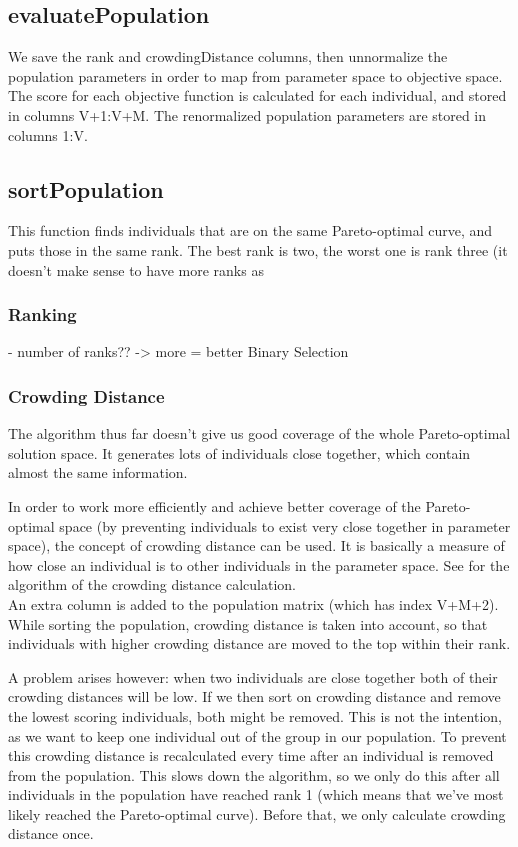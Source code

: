 \subsection{evaluatePopulation} \label{evaluatePopulation}
We save the rank and crowdingDistance columns, then unnormalize the population parameters in order to map from parameter space to objective space. The score for each objective function is calculated for each individual, and stored in columns V+1:V+M. The renormalized population parameters are stored in columns 1:V. 

\subsection{sortPopulation} \label{sortPopulation}
This function finds individuals that are on the same Pareto-optimal curve, and puts those in the same rank. The best rank is two, the worst one is rank three (it doesn't make sense to have more ranks as 
\subsubsection{Ranking}
- number of ranks?? -> more = better Binary Selection

\subsubsection{Crowding Distance}
The algorithm thus far doesn't give us good coverage of the whole Pareto-optimal solution space. It generates lots of individuals close together, which contain almost the same information. 


In order to work more efficiently and achieve better coverage of the Pareto-optimal space (by preventing individuals to exist very close together in parameter space), the concept of crowding distance can be used. It is basically a measure of how close an individual is to other individuals in the parameter space. See  for the algorithm of the crowding distance calculation.\\
An extra column is added to the population matrix (which has index V+M+2). While sorting the population, crowding distance is taken into account, so that individuals with higher crowding distance are moved to the top within their rank.


A problem arises however: when two individuals are close together both of their crowding distances will be low. If we then sort on crowding distance and remove the lowest scoring individuals, both might be removed. This is not the intention, as we want to keep one individual out of the group in our population. To prevent this crowding distance is recalculated every time after an individual is removed from the population. This slows down the algorithm, so we only do this after all individuals in the population have reached rank 1 (which means that we've most likely reached the Pareto-optimal curve). Before that, we only calculate crowding distance once.

